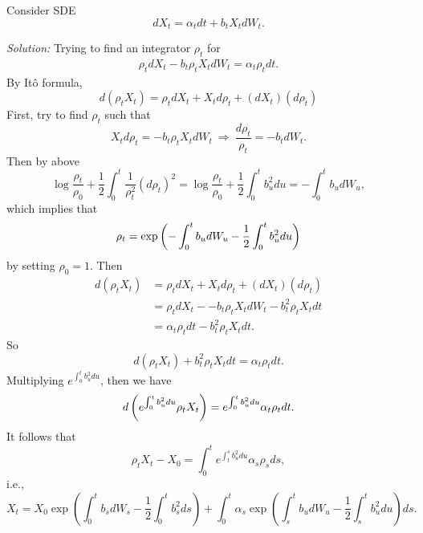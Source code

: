 \begin{exam}
    Consider SDE
    \begin{equation*}
        dX_t = \alpha_t dt + b_t X_tdW_t.
    \end{equation*}

    \noindent \emph{Solution:} Trying to find an integrator $\rho_t$ for
    \begin{align*}
        \rho_tdX_t - b_t\rho_t X_tdW_t = \alpha_t\rho_t dt.
    \end{align*}
    By It\^o formula, 
    \begin{equation*}
       d(\rho_t X_t) = \rho_t dX_t + X_t d\rho_t+ (dX_t)(d\rho_t) 
    \end{equation*}
    First, try to find $\rho_t$ such that
    \begin{equation*}
        X_t d\rho_t = - b_t\rho_t X_tdW_t~\Rightarrow~ \frac{d\rho_t}{\rho_t} = -b_tdW_t.
    \end{equation*}
    Then by above
    \begin{equation*}
        \log \frac{\rho_t}{\rho_0} + \frac{1}{2}\int_0^t \frac{1}{\rho_t^2}(d\rho_t)^2 = \log \frac{\rho_t}{\rho_0} + \frac{1}{2}\int_0^tb_u^2du = - \int_0^t b_u dW_u,
    \end{equation*}
    which implies that
    \begin{equation*}
        \rho_t = \exp\left(- \int_0^t b_u dW_u -  \frac{1}{2}\int_0^tb_u^2du\right)
    \end{equation*}
    by setting $\rho_0 = 1$. Then
    \begin{align*}
        d(\rho_t X_t) &= \rho_t dX_t + X_t d\rho_t+ (dX_t)(d\rho_t) \\
        &= \rho_t dX_t - - b_t\rho_t X_tdW_t - b_t^2\rho_tX_t dt \\
        &= \alpha_t\rho_t dt - b_t^2\rho_tX_t dt.
    \end{align*}
    So
    \begin{equation*}
        d(\rho_t X_t) +  b_t^2\rho_tX_t dt = \alpha_t\rho_t dt.
    \end{equation*}
    Multiplying $e^{\int_0^t b_u^2 du}$, then we have
    \begin{equation*}
        d\left(e^{\int_0^t b_u^2 du} \rho_t X_t\right) = e^{\int_0^t b_u^2 du}\alpha_t\rho_t dt.
    \end{equation*}
    It follows that
    \begin{equation*}
        \rho_t X_t - X_0 = \int_0^t e^{\int_t^s b_u^2 du}\alpha_s\rho_s ds,
    \end{equation*}
    i.e.,
    \begin{equation*}
        X_t = X_0 \exp \left(\int_0^t b_s d W_s-\frac{1}{2} \int_0^t b_s^2 d s\right)+\int_0^t \alpha_s \exp \left(\int_s^t b_u d W_u-\frac{1}{2} \int_s^t b_u^2 d u\right) d s.
    \end{equation*}
\end{exam}

